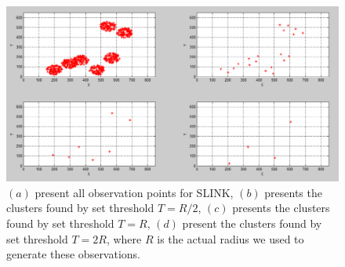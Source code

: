 \documentclass[12pt]{article}
\begin{document}
%
\begin{figure}[h!]
\centering
\includegraphics[width=5.5in]{GDataPlot6.png}
\caption{$(a)$ present all observation points for SLINK, $(b)$ presents the clusters found by set threshold $T=R/2$, $(c)$ presents the clusters found by set threshold $T=R$, $(d)$ present the clusters found by set threshold $T=2R$, where $R$ is the actual radius we used to generate these observations.}
\label{fig:SLINKCluster}
\end{figure}
\end{document}
